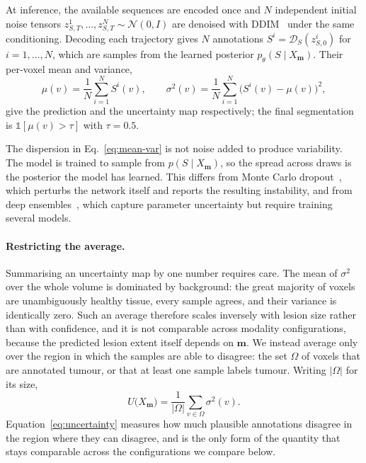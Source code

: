 At inference, the available sequences are encoded once and $N$ independent
initial noise tensors $z_{S,T}^{1}, \dots, z_{S,T}^{N} \sim \mathcal{N}(0, I)$
are denoised with DDIM~\cite{ddim} under the same conditioning. Decoding each
trajectory gives $N$ annotations $S^{i} = \mathcal{D}_{S}(z_{S,0}^{i})$ for
$i = 1, \dots, N$, which are samples from the learned posterior
$p_{\theta}(S \mid X_{\mathbf{m}})$. Their per-voxel mean and variance,
\begin{equation}
    \mu(v) = \frac{1}{N} \sum_{i=1}^{N} S^{i}(v),
    \qquad
    \sigma^{2}(v) = \frac{1}{N} \sum_{i=1}^{N}
        \bigl( S^{i}(v) - \mu(v) \bigr)^{2},
    \label{eq:mean-var}
\end{equation}
give the prediction and the uncertainty map respectively; the final
segmentation is $\mathbb{1}[\mu(v) > \tau]$ with $\tau = 0.5$.

The dispersion in Eq.~\eqref{eq:mean-var} is not noise added to produce
variability. The model is trained to sample from
$p(S \mid X_{\mathbf{m}})$, so the spread across draws is the posterior the
model has learned. This differs from Monte Carlo dropout~\cite{mcdropout},
which perturbs the network itself and reports the resulting instability, and
from deep ensembles~\cite{deepensembles}, which capture parameter uncertainty
but require training several models.

\paragraph{Restricting the average.}
Summarising an uncertainty map by one number requires care. The mean of
$\sigma^{2}$ over the whole volume is dominated by background: the great
majority of voxels are unambiguously healthy tissue, every sample agrees, and
their variance is identically zero. Such an average therefore scales inversely
with lesion size rather than with confidence, and it is not comparable across
modality configurations, because the predicted lesion extent itself depends
on $\mathbf{m}$. We instead average only over the
region in which the samples are able to disagree: the set $\Omega$ of voxels
that are annotated tumour, or that at least one sample labels tumour. Writing
$|\Omega|$ for its size,
\begin{equation}
    U\bigl(X_{\mathbf{m}}\bigr)
    = \frac{1}{|\Omega|} \sum_{v \in \Omega} \sigma^{2}(v).
    \label{eq:uncertainty}
\end{equation}
Equation~\eqref{eq:uncertainty} measures how much plausible annotations
disagree in the region where they can disagree, and is the only form of the
quantity that stays comparable across the configurations we compare below.

